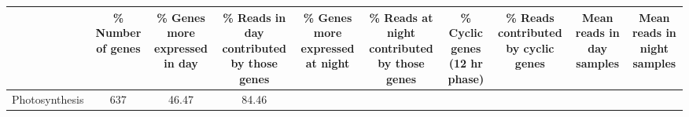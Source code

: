 \documentclass[]{article}
\begin{document}
\begin{longtable}[]{@{}lccccccccc@{}}
\toprule
\begin{minipage}[b]{0.07\columnwidth}\raggedright\strut
\strut
\end{minipage} & \begin{minipage}[b]{0.06\columnwidth}\centering\strut
\% Number of genes\strut
\end{minipage} & \begin{minipage}[b]{0.08\columnwidth}\centering\strut
\% Genes more expressed in day\strut
\end{minipage} & \begin{minipage}[b]{0.08\columnwidth}\centering\strut
\% Reads in day contributed by those genes\strut
\end{minipage} & \begin{minipage}[b]{0.08\columnwidth}\centering\strut
\% Genes more expressed at night\strut
\end{minipage} & \begin{minipage}[b]{0.08\columnwidth}\centering\strut
\% Reads at night contributed by those genes\strut
\end{minipage} & \begin{minipage}[b]{0.08\columnwidth}\centering\strut
\% Cyclic genes (12 hr phase)\strut
\end{minipage} & \begin{minipage}[b]{0.08\columnwidth}\centering\strut
\% Reads contributed by cyclic genes\strut
\end{minipage} & \begin{minipage}[b]{0.08\columnwidth}\centering\strut
Mean reads in day samples\strut
\end{minipage} & \begin{minipage}[b]{0.08\columnwidth}\centering\strut
Mean reads in night samples\strut
\end{minipage}\tabularnewline
\midrule
\endhead
\begin{minipage}[t]{0.07\columnwidth}\raggedright\strut
Photosynthesis\strut
\end{minipage} & \begin{minipage}[t]{0.06\columnwidth}\centering\strut
637\strut
\end{minipage} & \begin{minipage}[t]{0.08\columnwidth}\centering\strut
46.47\strut
\end{minipage} & \begin{minipage}[t]{0.08\columnwidth}\centering\strut
84.46\strut
\end{minipage} & \begin{minipage}[t]{0.08\columnwidth}\centering\strut

\end{minipage}
\end{longtable}
\end{document}
